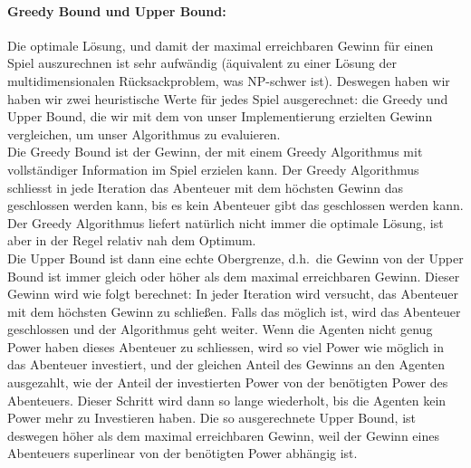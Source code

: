 \documentclass[fleqn,10pt]{SelfArx} %
\begin{document}
\paragraph{Greedy Bound und Upper Bound:}
Die optimale Lösung, und damit der maximal erreichbaren Gewinn für einen Spiel auszurechnen ist sehr aufwändig (äquivalent zu einer Lösung der multidimensionalen Rücksackproblem, was NP-schwer ist). Deswegen haben wir haben wir zwei heuristische Werte für jedes Spiel ausgerechnet: die Greedy und Upper Bound, die wir mit dem von unser Implementierung erzielten Gewinn vergleichen, um unser Algorithmus zu evaluieren. \\
Die Greedy Bound ist der Gewinn, der mit einem Greedy Algorithmus mit vollständiger Information im Spiel erzielen kann. Der Greedy Algorithmus schliesst in jede Iteration das Abenteuer mit dem höchsten Gewinn das geschlossen werden kann, bis es kein Abenteuer gibt das geschlossen werden kann. Der Greedy Algorithmus liefert natürlich nicht immer die optimale Lösung, ist aber in der Regel relativ nah dem Optimum.\\
Die Upper Bound ist dann eine echte Obergrenze, d.h.\ die Gewinn von der Upper Bound ist immer gleich oder höher als dem maximal erreichbaren Gewinn. Dieser Gewinn wird wie folgt berechnet: In jeder Iteration wird versucht, das Abenteuer mit dem höchsten Gewinn zu schließen. Falls das möglich ist, wird das Abenteuer geschlossen und der Algorithmus geht weiter. Wenn die Agenten nicht genug Power haben dieses Abenteuer zu schliessen, wird so viel Power wie möglich in das Abenteuer investiert, und der gleichen Anteil des Gewinns an den Agenten ausgezahlt, wie der Anteil der investierten Power von der benötigten Power des Abenteuers. Dieser Schritt wird dann so lange wiederholt, bis die Agenten kein Power mehr zu Investieren haben. Die so ausgerechnete Upper Bound, ist deswegen höher als dem maximal erreichbaren Gewinn, weil der Gewinn eines Abenteuers superlinear von der benötigten Power abhängig ist.
\end{document}
